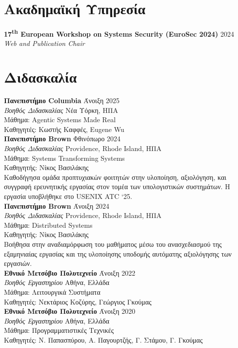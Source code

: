 \documentclass[margin, 12pt]{resume}
\newcommand{\sectionVSpace}{\vspace{-3.5ex}} %
\newcommand{\institution}[1]{\textbf{#1}\xspace}
\newcommand{\ordinal}[1]{\textsuperscript{#1}\xspace}
\newcommand{\rSection}[1]{\sectionVSpace\section{#1}\xspace}
\newcommand{\role}[1]{\textit{#1}\xspace}
\newcommand{\service}[1]{\textbf{#1}\xspace}
\newcommand{\stitle}[1]{#1:\xspace}
\begin{document}
\begin{resume}
    \rSection{Ακαδημαϊκή Υπηρεσία}

    \service{17\ordinal{th} European Workshop on Systems Security (EuroSec 2024)} \hfill 2024 \\
    \role{Web and Publication Chair} \\

    \rSection{Διδασκαλία}

    \institution{Πανεπιστήμιο Columbia} \hfill Άνοιξη 2025 \\
    \role{Βοηθός Διδασκαλίας} \hfill Νέα Υόρκη, ΗΠΑ \\
    \stitle{Μάθημα} Agentic Systems Made Real \\
    \stitle{Καθηγητές} Κωστής Καφφές, Eugene Wu \\

    \institution{Πανεπιστήμιο Brown} \hfill Φθινόπωρο 2024 \\
    \role{Βοηθός Διδασκαλίας} \hfill Providence, Rhode Island, ΗΠΑ \\
    \stitle{Μάθημα} Systems Transforming Systems \\
    \stitle{Καθηγητής} Νίκος Βασιλάκης \\
    Καθοδήγησα ομάδα προπτυχιακών φοιτητών στην υλοποίηση, αξιολόγηση, και συγγραφή ερευνητικής εργασίας στον τομέα των υπολογιστικών συστημάτων. Η εργασία υποβλήθηκε στο USENIX ATC `25. \\

    \institution{Πανεπιστήμιο Brown} \hfill Άνοιξη 2024 \\
    \role{Βοηθός Διδασκαλίας} \hfill Providence, Rhode Island, ΗΠΑ \\
    \stitle{Μάθημα} Distributed Systems \\
    \stitle{Καθηγητής} Νίκος Βασιλάκης \\
    Βοήθησα στην αναδιαμόρφωση του μαθήματος μέσω του ανασχεδιασμού της εξαμηνιαίας εργασίας και της υλοποίησης υποδομής αυτόματης αξιολόγησης των εργασιών. \\

    \institution{Εθνικό Μετσόβιο Πολυτεχνείο} \hfill Άνοιξη 2022 \\
    \role{Βοηθός Εργαστηρίου} \hfill Αθήνα, Ελλάδα \\
    \stitle{Μάθημα} Λειτουργικά Συστήματα \\
    \stitle{Καθηγητές} Νεκτάριος Κοζύρης, Γεώργιος Γκούμας \\

    \institution{Εθνικό Μετσόβιο Πολυτεχνείο} \hfill Άνοιξη 2020 \\
    \role{Βοηθός Εργαστηρίου} \hfill Αθήνα, Ελλάδα \\
    \stitle{Μάθημα} Προγραμματιστικές Τεχνικές \\
    \stitle{Καθηγητές} Ν. Παπασπύρου, Α. Παγουρτζής, Γ. Στάμου, Γ. Γκούμας \\


\end{resume}
\end{document}
